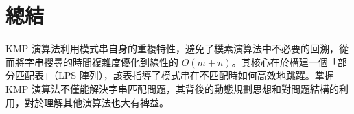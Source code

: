 \section{總結}
KMP 演算法利用模式串自身的重複特性，避免了樸素演算法中不必要的回溯，從而將字串搜尋的時間複雜度優化到線性的 $O(m+n)$。其核心在於構建一個「部分匹配表」（LPS 陣列），該表指導了模式串在不匹配時如何高效地跳躍。掌握 KMP 演算法不僅能解決字串匹配問題，其背後的動態規劃思想和對問題結構的利用，對於理解其他演算法也大有裨益。
